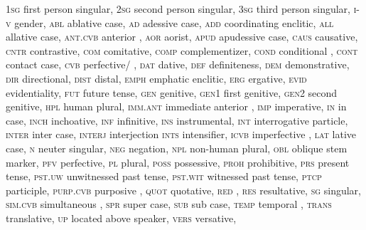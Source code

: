 \documentclass[output=paper]{LSP/langsci}
\begin{document}
\textsc{1sg}		first person singular,
\textsc{2sg}		second person singular,
\textsc{3sg} 		third person singular,
\textsc{i-v}		gender,
\textsc{abl}		ablative case,
\textsc{ad}		adessive case,
\textsc{add}		coordinating enclitic,
\textsc{all}		allative case,
\textsc{ant.cvb}	anterior ,
\textsc{aor}		aorist,
\textsc{apud}		apudessive case,
\textsc{caus}		causative,
\textsc{cntr}		contrastive,
\textsc{com}		comitative,
\textsc{comp}		complementizer,	
\textsc{cond}		conditional ,
\textsc{cont}		contact case,
\textsc{cvb}		perfective/ ,
\textsc{dat}		dative,
\textsc{def}		definiteness,
\textsc{dem}		demonstrative,
\textsc{dir}		directional,
\textsc{dist}		distal,
\textsc{emph}		emphatic enclitic,
\textsc{erg}		ergative,
\textsc{evid}		evidentiality,
\textsc{fut}		future tense,
\textsc{gen}		genitive,
\textsc{gen1}		first genitive,
\textsc{gen2} 		second genitive,
\textsc{hpl}		human plural,
\textsc{imm.ant}	immediate anterior ,
\textsc{imp}		imperative,
\textsc{in}		in case,
\textsc{inch}		inchoative,
\textsc{inf}		infinitive,
\textsc{ins}		instrumental,
\textsc{int}		interrogative particle,
\textsc{inter} 		inter case,
\textsc{interj}	interjection
\textsc{ints}		intensifier,
\textsc{icvb}		imperfective ,
\textsc{lat}		lative case,
\textsc{n}		neuter singular,
\textsc{neg}		negation,
\textsc{npl}		non-human plural,
\textsc{obl}		oblique stem marker,
\textsc{pfv}		perfective,
\textsc{pl}		plural,
\textsc{poss}		possessive,
\textsc{proh}		prohibitive,
\textsc{prs}		present tense,
\textsc{pst.uw}		unwitnessed past tense,
\textsc{pst.wit}		witnessed past tense,
\textsc{ptcp}		participle,
\textsc{purp.cvb}	purposive ,
\textsc{quot}		quotative,
\textsc{red}		,
\textsc{res}		resultative,
\textsc{sg}		singular,
\textsc{sim.cvb}	simultaneous ,
\textsc{spr}		super case, 
\textsc{sub}		sub case,
\textsc{temp}		temporal ,
\textsc{trans}	translative,
\textsc{up}		located above speaker,
\textsc{vers}		versative,



\sloppy

\printbibliography[heading=subbibliography,notkeyword=this]
\end{document}
